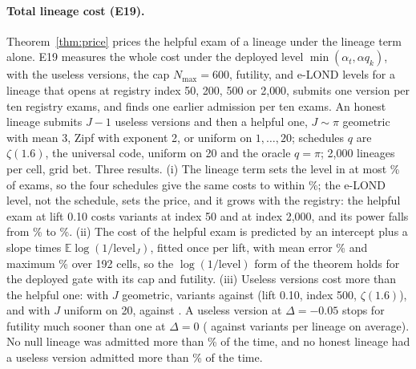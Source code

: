 \paragraph{Total lineage cost (E19).} Theorem~\ref{thm:price} prices the helpful exam of a lineage under the lineage term alone. E19 measures the whole cost under the deployed level $\min(\alpha_t,\alpha q_k)$, with the useless versions, the cap $N_{\max}=600$, futility, and e-LOND levels for a lineage that opens at registry index 50, 200, 500 or 2{,}000, submits one version per ten registry exams, and finds one earlier admission per ten exams. An honest lineage submits $J-1$ useless versions and then a helpful one, $J\sim\pi$ geometric with mean 3, Zipf with exponent 2, or uniform on $1,\ldots,20$; schedules $q$ are $\zeta(1.6)$, the universal code, uniform on 20 and the oracle $q=\pi$; 2{,}000 lineages per cell, grid bet. Three results. (i) The lineage term sets the level in at most \NLcBindMax\% of exams, so the four schedules give the same costs to within \NLcSchedSpread\%; the e-LOND level, not the schedule, sets the price, and it grows with the registry: the helpful exam at lift 0.10 costs \NLcHelpAgeFifty{} variants at index 50 and \NLcHelpAgeTwoK{} at index 2{,}000, and its power falls from \NLcAdmAgeFifty\% to \NLcAdmAgeTwoK\%. (ii) The cost of the helpful exam is predicted by an intercept plus a slope times $\mathbb{E}\log(1/\text{level}_J)$, fitted once per lift, with mean error \NLcPredErrMean\% and maximum \NLcPredErrMax\% over 192 cells, so the $\log(1/\text{level})$ form of the theorem holds for the deployed gate with its cap and futility. (iii) Useless versions cost more than the helpful one: with $J$ geometric, \NLcGeoUseless{} variants against \NLcGeoHelp{} (lift 0.10, index 500, $\zeta(1.6)$), and with $J$ uniform on 20, \NLcUniUseless{} against \NLcUniHelp. A useless version at $\Delta=-0.05$ stops for futility much sooner than one at $\Delta=0$ (\NLcUselessNeg{} against \NLcUselessZero{} variants per lineage on average). No null lineage was admitted more than \NLcNullMax\% of the time, and no honest lineage had a useless version admitted more than \NLcHonFalseMax\% of the time.

